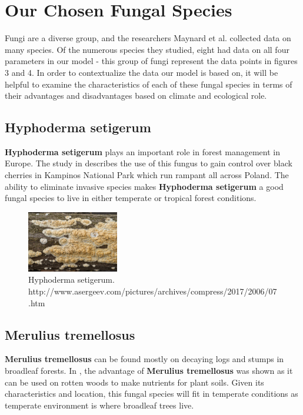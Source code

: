 \documentclass[12pt]{article}
\begin{document}
\section{Our Chosen Fungal Species}

Fungi are a diverse group, and the researchers Maynard et al. collected data on many species. Of the numerous species they studied, eight had data on all four parameters in our model - this group of fungi represent the data points in figures 3 and 4. In order to contextualize the data our model is based on, it will be helpful to examine the characteristics of each of these fungal species in terms of their advantages and disadvantages based on climate and ecological role.

\subsection{Hyphoderma setigerum}

\textbf{Hyphoderma setigerum} plays an important role in forest management in Europe. The study in \cite{blackCherry} describes the use of this fungus to gain control over black cherries in Kampinos National Park which run rampant all across Poland. The ability to eliminate invasive species makes \textbf{Hyphoderma setigerum} a good fungal species to live in either temperate or tropical forest conditions.

\begin{figure}[h!]
\begin{center}
\includegraphics[width=4cm]{Hyphoderma.jpg}
\caption{Hyphoderma setigerum. \centering http://www.asergeev.com/pictures/archives/compress/2017/2006/07.htm }
\end{center}
\end{figure}

\subsection{Merulius tremellosus}
\textbf{Merulius tremellosus} can be found mostly on decaying logs and stumps in broadleaf forests. In \cite{Merulius}, the advantage of \textbf{Merulius tremellosus} was shown as it can be used on rotten woods to make nutrients for plant soils. Given its characteristics and location, this fungal species will fit in temperate conditions as temperate environment is where broadleaf trees live.
\end{document}
